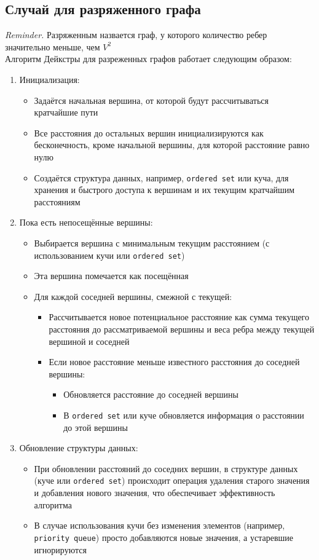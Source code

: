 \documentclass[a4paper]{article}
\newcommand{\code}[1]{\colorbox{codegray}{\texttt{#1}}}
\begin{document}
\subsection*{Случай для разряженного графа}
\indent \textit{Reminder.} Разряженным назвается граф, у которого количество ребер значительно меньше, чем $V^2$ \\[2mm]
Алгоритм Дейкстры для разреженных графов работает следующим образом:
\begin{enumerate}
    \item Инициализация:
    \begin{itemize}
        \item Задаётся начальная вершина, от которой будут рассчитываться кратчайшие пути
        \item Все расстояния до остальных вершин инициализируются как бесконечность, кроме начальной вершины, для которой расстояние равно нулю
        \item Создаётся структура данных, например, \code{ordered set} или куча, для хранения и быстрого доступа к вершинам и их текущим кратчайшим расстояниям
    \end{itemize}
    \item Пока есть непосещённые вершины:
    \begin{itemize}
        \item Выбирается вершина с минимальным текущим расстоянием (с использованием кучи или \code{ordered set})
        \item Эта вершина помечается как посещённая
        \item Для каждой соседней вершины, смежной с текущей:
        \begin{itemize}
            \item Рассчитывается новое потенциальное расстояние как сумма текущего расстояния до рассматриваемой вершины и веса ребра между текущей вершиной и соседней
            \item Если новое расстояние меньше известного расстояния до соседней вершины:
            \begin{itemize}
                \item Обновляется расстояние до соседней вершины
                \item В \code{ordered set} или куче обновляется информация о расстоянии до этой вершины
            \end{itemize}
        \end{itemize}
    \end{itemize}
    \item Обновление структуры данных:
    \begin{itemize}
        \item При обновлении расстояний до соседних вершин, в структуре данных (куче или \code{ordered set}) происходит операция удаления старого значения и добавления нового значения, что обеспечивает эффективность алгоритма
        \item В случае использования кучи без изменения элементов (например, \code{priority queue}) просто добавляются новые значения, а устаревшие игнорируются
    \end{itemize}
\end{enumerate}
\end{document}
